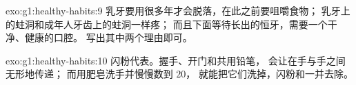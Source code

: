 \begin{solution}{exo:g1:healthy-habits:9}
乳牙要用很多年才会脱落，在此之前要咀嚼食物；
乳牙上的蛀洞和成年人牙齿上的蛀洞一样疼；
而且下面等待长出的恒牙，需要一个干净、健康的口腔。
写出其中两个理由即可。
\end{solution}

\begin{solution}{exo:g1:healthy-habits:10}
闪粉代表。握手、开门和共用铅笔，
会让在手与手之间无形地传递；
而用肥皂洗手并慢慢数到 $20$，
就能把它们洗掉，闪粉和一并去除。
\end{solution}
